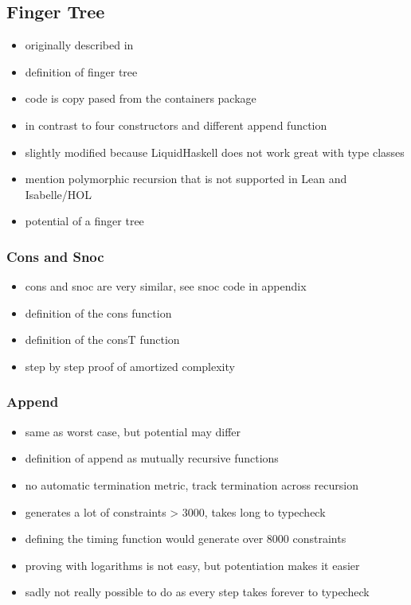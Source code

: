 \documentclass[sigplan,screen]{acmart}
\begin{document}
\subsection{Finger Tree}

\begin{itemize}
\item{originally described in \cite{fingertrees}}
\item{definition of finger tree}
\item{code is copy pased from the containers package}
\item{in contrast to \cite{fingertrees_new} four constructors and different append function}
\item{slightly modified because LiquidHaskell does not work great with type classes}
\item{mention polymorphic recursion that is not supported in Lean \cite{lean} and Isabelle/HOL \cite{isabelle}}
\item{potential of a finger tree}
\end{itemize}

\subsubsection{Cons and Snoc}

\begin{itemize}
\item{cons and snoc are very similar, see snoc code in appendix}
\item{definition of the cons function}
\item{definition of the consT function}
\item{step by step proof of amortized complexity}
\end{itemize}

\subsubsection{Append}\label{sec:append}

\begin{itemize}
\item{same as worst case, but potential may differ}
\item{definition of append as mutually recursive functions}
\item{no automatic termination metric, track termination across recursion}
\item{generates a lot of constraints > 3000, takes long to typecheck}
\item{defining the timing function would generate over 8000 constraints}
\item{proving with logarithms is not easy, but potentiation makes it easier}
\item{sadly not really possible to do as every step takes forever to typecheck}
\end{itemize}
\end{document}
